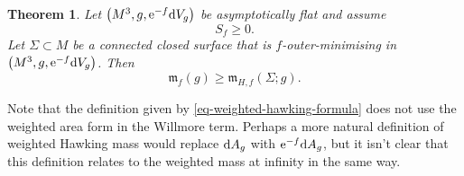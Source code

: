 \documentclass[10pt,a4paper]{amsart}
\numberwithin{equation}{section}
\newtheorem{Theorem}{Theorem}[section]
\theoremstyle{definition}
\begin{document}
\begin{Theorem}\label{thm-weighted-hawking-bound}
	Let $\bigl(M^3,g,{\rm e}^{-f}{\rm d}V_g\bigr)$ be asymptotically flat and assume
	\[
	S_f \ge 0.
	\]
	Let $\Sigma\subset M$ be a connected closed surface that is $f$-outer-minimising in $\bigl(M^3,g,{\rm e}^{-f}{\rm d}V_g\bigr)$.
	Then
	\begin{equation*}%
		\mathfrak{m}_f(g) \ge \mathfrak{m}_{H,f}(\Sigma;g).
	\end{equation*}
\end{Theorem}
Note that the definition given by \eqref{eq-weighted-hawking-formula} does not use the weighted area form in the Willmore term. Perhaps a more natural definition of weighted Hawking mass would replace ${\rm d}A_g$ with ${\rm e}^{-f}{\rm d}A_g$, but it isn't clear that this definition relates to the weighted mass at infinity in the same way.
\end{document}

